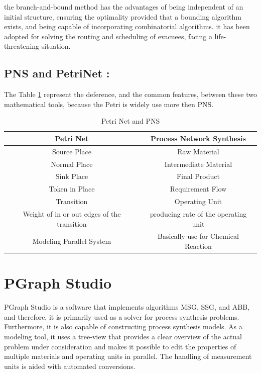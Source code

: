 the branch-and-bound method has the
advantages of being independent of an initial structure, 
ensuring the optimality provided that a bounding algorithm exists, and being capable of incorporating
combinatorial algorithms\cite{algo}.
it has been adopted for solving the routing and scheduling of evacuees, facing a life-threatening situation\cite{pns4}. 

\subsection{PNS and PetriNet :} 
The Table \ref{tab:Petri Net and PNS} represent the deference, and the common features, between these two mathematical tools,  because the Petri is widely use more then PNS.
\begin {table}[H] 
\begin{tabular}{cc}

\hline 
\textbf{Petri Net}  & \textbf{Process Network Synthesis}\tabularnewline
\hline 
Source Place  & Raw Material\tabularnewline
Normal Place  & Intermediate Material\tabularnewline
Sink Place  & Final Product\tabularnewline
Token in Place  & Requirement Flow \tabularnewline
Transition  & Operating Unit \tabularnewline
Weight of in or out edges of the  transition & producing rate of the operating unit\tabularnewline
\hline 
Modeling Parallel System  & Basically use for Chemical Reaction \tabularnewline
\hline 

\end{tabular}
\caption {Petri Net and PNS}
 \label{tab:Petri Net and PNS}
\end {table}



\section{PGraph Studio}   
PGraph Studio is a software that implements algorithms MSG, SSG, and ABB, and therefore, it is primarily
used as a solver for process synthesis problems. Furthermore, it is also capable of constructing process synthesis models.
As a modeling tool, it uses a tree-view that provides a clear overview of the actual problem under consideration and makes
it possible to edit the properties of multiple materials and operating units in parallel. The handling of measurement units
is aided with automated conversions. \cite{ch3-pgraph2, Sitepgraph}


